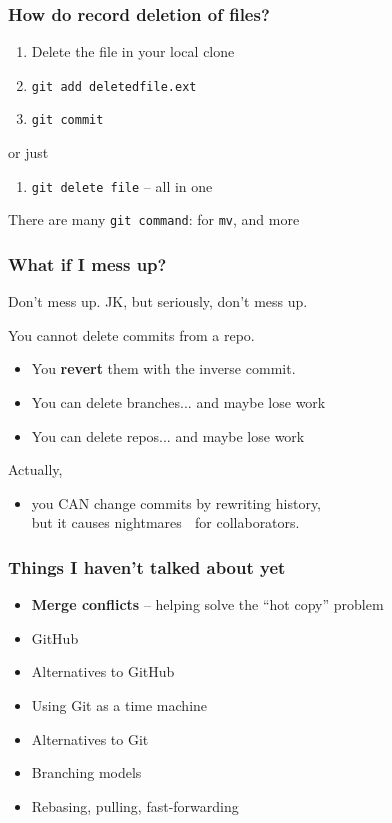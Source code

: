 \documentclass[14pt,aspectratio=1610]{beamer} %
\newcommand{\fframe}[2]{
   \begin{frame}
\frametitle{#1}
#2
\end{frame}
}
\begin{document}
\fframe{How do record deletion of files?}
{
	\begin{enumerate}
		\item Delete the file in your local clone
		\item {\tt git add deletedfile.ext}
		\item {\tt git commit}
	\end{enumerate}

	or just

	\begin{enumerate}
		\item {\tt git delete file} -- all in one
	\end{enumerate}

	There are many {\tt git command}: for {\tt mv}, and more
}


\fframe{What if I mess up?}
{
	Don't mess up.   JK, but seriously, don't mess up.

\vspace{\baselineskip}

	You cannot delete commits from a repo.
	\begin{itemize}
		\item You {\bf revert} them with the inverse commit.
		\item You can delete branches... and maybe lose work
		\item You can delete repos... and maybe lose work
	\end{itemize}

\vspace{5mm}

Actually,
	\begin{itemize}
		\item you CAN change commits by rewriting history, \\
		but it causes nightmares 🧌 for collaborators.
	\end{itemize}
}









\fframe{Things I haven't talked about yet}
{
	\begin{itemize}
		\item {\bf Merge conflicts} -- helping solve the ``hot copy'' problem
		\item GitHub
		\item Alternatives to GitHub
		\item Using Git as a time machine
		\item Alternatives to Git
		\item Branching models
		\item Rebasing, pulling, fast-forwarding
	\end{itemize}
}
\end{document}
